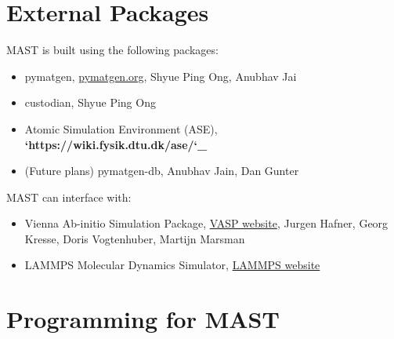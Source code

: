 \documentclass[letterpaper,10pt,english]{sphinxmanual}
\begin{document}
\chapter{External Packages}
\label{7_0_externalpackages:external-packages}\label{7_0_externalpackages::doc}
MAST is built using the following packages:
\begin{itemize}
\item {} 
pymatgen, \href{http://pymatgen.org}{pymatgen.org}, Shyue Ping Ong, Anubhav Jai

\item {} 
custodian, Shyue Ping Ong

\item {} 
Atomic Simulation Environment (ASE), {\color{red}\bfseries{}{}`https://wiki.fysik.dtu.dk/ase/{}`\_}

\item {} 
(Future plans) pymatgen-db, Anubhav Jain, Dan Gunter

\end{itemize}

MAST can interface with:
\begin{itemize}
\item {} 
Vienna Ab-initio Simulation Package, \href{https://www.vasp.at/}{VASP website}, Jurgen Hafner, Georg Kresse, Doris Vogtenhuber, Martijn Marsman

\item {} 
LAMMPS Molecular Dynamics Simulator, \href{http://lammps.sandia.gov/}{LAMMPS website}

\end{itemize}


\chapter{Programming for MAST}
\label{12_0_programming:programming-for-mast}\label{12_0_programming::doc}
\end{document}
